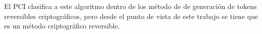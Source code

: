 


%
%
%

El PCI clasifica a este algoritmo dentro de los método de de generación de
tokens reversibles criptográficos, pero desde el punto de vista de este
trabajo se tiene que es un método criptográfico reversible.

